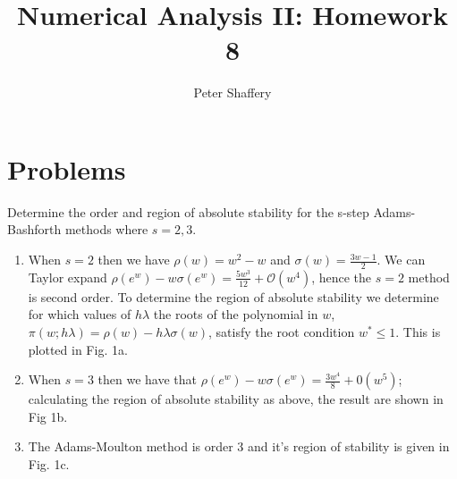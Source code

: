 \documentclass[10pt,a4paper]{article}
\newenvironment{problem}[2][Problem]{\begin{trivlist}
\item[\hskip \labelsep {\bfseries #1}\hskip \labelsep {\bfseries #2.}]}{\end{trivlist}}
\begin{document}
\author{Peter Shaffery}
\title{Numerical Analysis II: Homework 8}
\maketitle
\section{Problems}
\begin{problem}{1}
Determine the order and region of absolute stability for the s-step Adams-Bashforth methods where $s=2,3$.
\end{problem}
\begin{enumerate}
\item When $s=2$ then we have $\rho(w) = w^2 - w$ and $\sigma(w) = \frac{3w-1}{2}$.  We can Taylor expand $\rho(e^w) - w \sigma(e^w) = \frac{5 w^3}{12} + \mathcal{O}(w^4)$, hence the $s=2$ method is second order.  To determine the region of absolute stability we determine for which values of $h \lambda$ the roots of the polynomial in $w$, $\pi(w;h \lambda) = \rho(w) - h \lambda \sigma(w)$, satisfy the root condition $w^* \leq 1$.  This is plotted in Fig. 1a.
\item When $s=3$ then we have that $\rho(e^w) - w \sigma(e^w) = \frac{3 w^4}{8} + \mathcal{0}(w^5)$; calculating the region of absolute stability as above, the result are shown in Fig 1b.
\item The Adams-Moulton method is order 3 and it's region of stability is given in Fig. 1c.
\end{enumerate}
\end{document}
